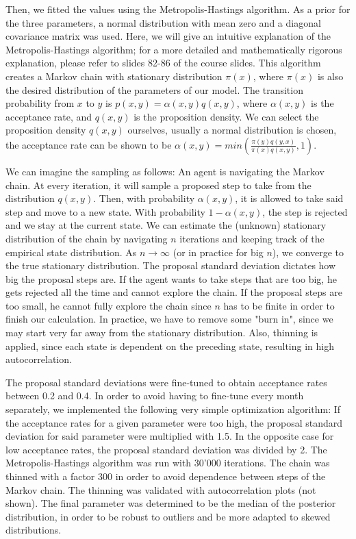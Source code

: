 \documentclass[10pt,conference,compsocconf]{IEEEtran}
\begin{document}
\par
Then, we fitted the values using the Metropolis-Hastings algorithm. As a prior for the three parameters, a normal distribution with mean zero and a diagonal covariance matrix was used.
Here, we will give an intuitive explanation of the Metropolis-Hastings algorithm; for a more detailed and mathematically rigorous explanation, please refer to slides 82-86 of the course slides.
This algorithm creates a Markov chain with stationary distribution $\pi(x)$, where $\pi(x)$ is also the desired distribution of the parameters of our model. The transition probability from $x$ to $y$ is $p(x,y)=\alpha(x,y) q(x,y)$, where $\alpha(x,y)$ is the acceptance rate, and $q(x,y)$ is the proposition density. We can select the proposition density $q(x,y)$ ourselves, usually a normal distribution is chosen, the acceptance rate can be shown to be $\alpha(x,y)=min(\frac{\pi(y) q(y,x)}{\pi(x) q(x,y)},1)$.
\par
We can imagine the sampling as follows: An agent is navigating the Markov chain. At every iteration, it will sample a proposed step to take from the distribution $q(x,y)$. Then, with probability $\alpha(x,y)$, it is allowed to take said step and move to a new state. With probability $1-\alpha(x,y)$, the step is rejected and we stay at the current state. We can estimate the (unknown) stationary distribution of the chain by navigating $n$ iterations and keeping track of the empirical state distribution. As $n \to \infty$ (or in practice for big $n$), we converge to the true stationary distribution. The proposal standard deviation dictates how big the proposal steps are. If the agent wants to take steps that are too big, he gets rejected all the time and cannot explore the chain. If the proposal steps are too small, he cannot fully explore the chain since $n$ has to be finite in order to finish our calculation. In practice, we have to remove some "burn in", since we may start very far away from the stationary distribution. Also, thinning is applied, since each state is dependent on the preceding state, resulting in high autocorrelation. 
\par
The proposal standard deviations were fine-tuned to obtain acceptance rates between 0.2 and 0.4. In order to avoid having to fine-tune every month separately, we implemented the following very simple optimization algorithm: If the acceptance rates for a given parameter were too high, the proposal standard deviation for said parameter were multiplied with 1.5. In the opposite case for low acceptance rates, the proposal standard deviation was divided by 2. The Metropolis-Hastings algorithm was run with 30'000 iterations. The chain was thinned with a factor 300 in order to avoid dependence between steps of the Markov chain. The thinning was validated with autocorrelation plots (not shown). The final parameter was determined to be the median of the posterior distribution, in order to be robust to outliers and be more adapted to skewed distributions. 
\end{document}
